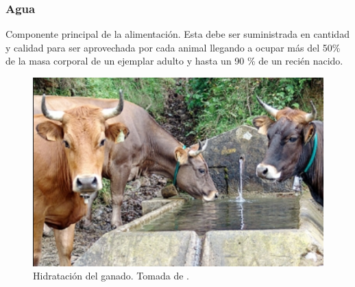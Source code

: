 \subsubsection{Agua}
    Componente principal de la alimentación. Esta debe ser suministrada en cantidad y calidad para ser aprovechada por cada animal llegando a ocupar más del 50\% de la masa corporal de un ejemplar adulto y hasta un 90 \% de un recién nacido.
    	
	\begin{figure}[H]
	 \begin{center}
	 \includegraphics[scale=0.67]{img/agua.png}
	 \end{center}
	 \caption{Hidratación del ganado. Tomada de \cite{contextoganadero}.	\label{energeticospng}}
	\end{figure}
    	
